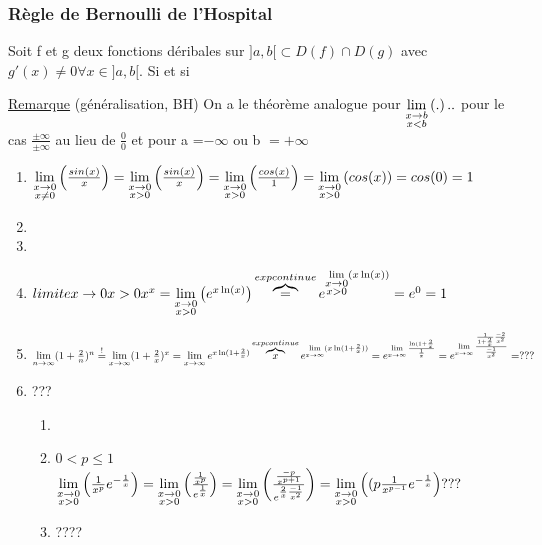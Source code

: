 \documentclass[12pt,a4paper]{article}
\begin{document}
{\subsubsection{Règle de Bernoulli de l'Hospital}
\begin{boite}
	\Theoreme Soit f et g deux fonctions déribales sur $]a,b[ \subset D(f) \cap D(g)$ avec $g'(x) \neq 0 \forall x \in ]a,b[$. Si  et si\\
\end{boite}
\begin{boite}
\underline{Remarque} (généralisation, BH) On a le théorème analogue pour $\lim\limits_{\substack{x\to b \\ x < b}}\left(.\right)..$ pour le cas $\frac{\pm \infty}{\pm \infty}$ au lieu de $\frac{0}{0}$ et pour a =$-\infty$ ou b $= + \infty$
\end{boite}
\begin{enumerate}[label = \Roman*)]
	\item $\lim\limits_{\substack{x \to 0 \\ x \neq 0}}\left(\frac{sin(x)}{x}\right) = \lim\limits_{\substack{x\to 0 \\ x > 0}}\left(\frac{sin(x)}{x}\right) = \lim\limits_{\substack{x\to 0 \\ x > 0}}\left(\frac{cos(x)}{1}\right) = \lim\limits_{\substack{x\to 0 \\ x > 0}}\left(cos(x)\right) = cos(0) = 1$
	\item 
	\item
	\item $\\limite{x\to 0}{x > 0}{x^x} = \lim\limits_{\substack{x\to 0 \\ x > 0}}\left(e^{x\ln(x)}\right) \overbrace{=}^{exp continue} e^{\lim\limits_{\substack{x\to 0 \\ x > 0}}\left(x\ln(x)\right)} = e^0 = 1$
	\item $\lim\limits_{n \to \infty} (1+\frac{2}{n})^n \overset{!}{=}  \lim\limits_{x\to \infty} (1+\frac{2}{x})^x = \lim\limits_{x\to \infty} e^{x\ln(1+\frac{2}{x})} \overbrace{x}^{exp continue} e^{\lim\limits_{x\to \infty}(x\ln(1+\frac{2}{x}))} = e^{\lim\limits_{x\to\infty}\frac{\ln(1+\frac{2}{x}}{\frac{1}{x}}} = e^{\lim\limits_{x\to\infty} \frac{\frac{1}{1+\frac{2}{x}} \frac{-2}{x^2}}{\frac{-1}{x^2}}} = ???$
	\item {} ???
	\begin{enumerate}[label=\roman*.]
		\item 
		\item $0 < p \leq 1$\\
				$\lim\limits_{\substack{x\to 0 \\ x > 0}}\left(\frac{1}{x^p}e^{-\frac{1}{x}}\right) = \lim\limits_{\substack{x\to 0 \\ x>0}}\left(\frac{\frac{1}{x^p}}{e^{\frac{1}{x}}}\right) = \lim\limits_{\substack{x \to 0 \\ x>0}}\left(\frac{\frac{-p}{x^{p+1}}}{e^{\frac{2}{x} \frac{-1}{x^2}}}\right) = \lim\limits_{\substack{x\to 0 \\ x>0}}\left((p\frac{1}{x^{p-1}} e^{-\frac{1}{x}}\right) ??? $
				\item ????
	\end{enumerate}
\end{enumerate}

}
\end{document}

